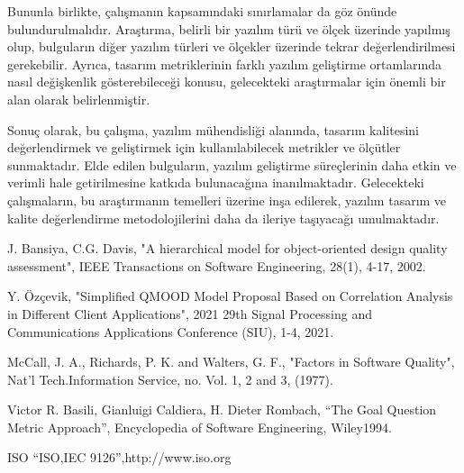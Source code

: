 \documentclass[conference]{IEEEtran}
\begin{document}
Bununla birlikte, çalışmanın kapsamındaki sınırlamalar da göz önünde bulundurulmalıdır. Araştırma, belirli bir yazılım türü ve ölçek üzerinde yapılmış olup, bulguların diğer yazılım türleri ve ölçekler üzerinde tekrar değerlendirilmesi gerekebilir. Ayrıca, tasarım metriklerinin farklı yazılım geliştirme ortamlarında nasıl değişkenlik gösterebileceği konusu, gelecekteki araştırmalar için önemli bir alan olarak belirlenmiştir.

Sonuç olarak, bu çalışma, yazılım mühendisliği alanında, tasarım kalitesini değerlendirmek ve geliştirmek için kullanılabilecek metrikler ve ölçütler sunmaktadır. Elde edilen bulguların, yazılım geliştirme süreçlerinin daha etkin ve verimli hale getirilmesine katkıda bulunacağına inanılmaktadır. Gelecekteki çalışmaların, bu araştırmanın temelleri üzerine inşa edilerek, yazılım tasarım ve kalite değerlendirme metodolojilerini daha da ileriye taşıyacağı umulmaktadır.

\begin{thebibliography}{1}
	
	J. Bansiya, C.G. Davis, "A hierarchical model for object-oriented design quality assessment", IEEE Transactions on Software Engineering, 28(1), 4-17, 2002.
	
	Y. Özçevik, "Simplified QMOOD Model Proposal Based on Correlation Analysis in Different Client Applications", 2021 29th Signal Processing and Communications Applications Conference (SIU), 1-4, 2021.
	
	McCall, J. A., Richards, P. K. and Walters, G. F., "Factors in Software Quality", Nat’l Tech.Information Service, no. Vol. 1, 2 and 3, (1977).
	
	Victor R. Basili, Gianluigi Caldiera, H. Dieter Rombach, “The Goal Question Metric Approach”, Encyclopedia of Software Engineering, Wiley1994.
	
	ISO “ISO,IEC 9126”,http://www.iso.org
	
\end{thebibliography}
\end{document}
